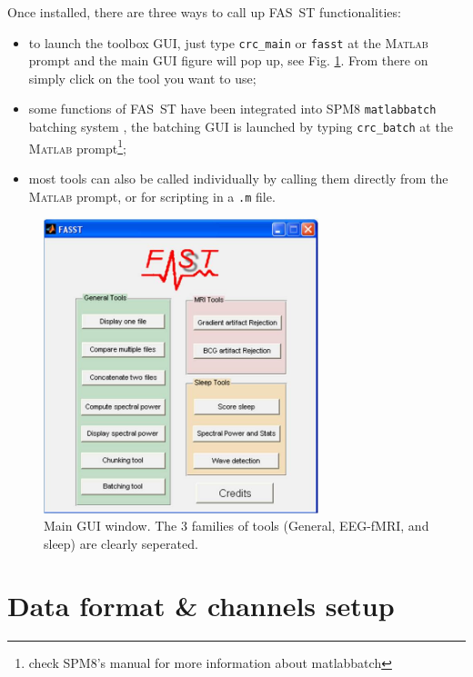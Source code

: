 \documentclass[a4paper,titlepage]{article}
\def\dblS{\hbox{S\hskip -4.5pt S}}
\newcommand{\bi}{\begin{itemize}}
\newcommand{\ei}{\end{itemize}}
\newcommand{\matlab}{\textsc{Matlab }}
\newcommand{\fasst}{FA\dblS T } 	%
\begin{document}
Once installed, there are three ways to call up \fasst functionalities: %
\bi
\item to launch the toolbox GUI, just type {\tt crc\_main} or {\tt fasst} at the \matlab prompt and the main GUI figure will pop up, see Fig. \ref{fig:crc_main}. From there on simply click on the tool you want to use;
\item some functions of \fasst have been integrated into SPM8 {\tt matlabbatch} batching system \cite{matlabbatch}, the batching GUI is launched by typing {\tt crc\_batch} at the \matlab prompt\footnote{check SPM8's manual for more information about matlabbatch};
\item most tools can also be called individually by calling them directly from the \matlab prompt, or for scripting in a {\tt .m} file.
\ei
\begin{figure}[ht]
	\centering
		\includegraphics[width=8cm]{images/FIG1_crc_main.JPG}
	\caption{Main GUI window. The 3 families of tools (General, EEG-fMRI, and sleep) are clearly seperated.
	\label{fig:crc_main}}
\end{figure}	

\section{Data format \& channels setup}
\label{sec:datachan}
\end{document}

